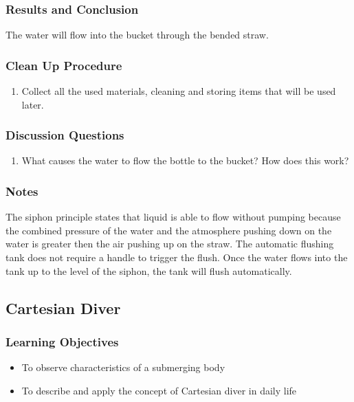 \subsubsection*{Results and Conclusion}
The water will flow into the bucket through the bended straw. 

\subsubsection*{Clean Up Procedure}
\begin{enumerate}
\item{Collect all the used materials, cleaning and storing items that will be used later.}
\end{enumerate}

\subsubsection*{Discussion Questions}
\begin{enumerate}
\item{What causes the water to flow the bottle to the bucket? How does this work?}
\end{enumerate}

\subsubsection*{Notes}
The siphon principle states that liquid is able to flow without pumping because the combined pressure of the water and the atmosphere pushing down on the water is greater then the air pushing up on the straw. The automatic flushing tank does not require a handle to trigger the flush. Once the water flows into the tank up to the level of the siphon, the tank will flush automatically. 


\subsection{Cartesian Diver}

\subsubsection*{Learning Objectives}
\begin{itemize}
\item{To observe characteristics of a submerging body}
\item{To describe and apply the concept of Cartesian diver in daily life}
\end{itemize}

